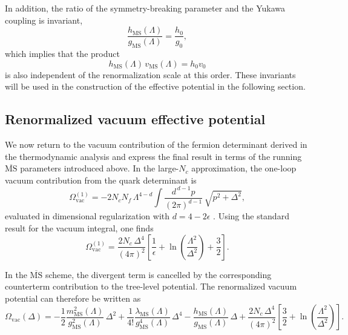 In addition, the ratio of the symmetry-breaking parameter and the
Yukawa coupling is invariant,
\begin{equation}
\frac{h_{\mathrm{MS}}(\Lambda)}{g_{\mathrm{MS}}(\Lambda)}
=
\frac{h_0}{g_0},
\end{equation}
which implies that the product
\begin{equation}
h_{\mathrm{MS}}(\Lambda)\,v_{\mathrm{MS}}(\Lambda)
=
h_0 v_0
\end{equation}
is also independent of the renormalization scale at this order.
These invariants will be used in the construction of the effective
potential in the following section.

\subsection*{Renormalized vacuum effective potential}

We now return to the vacuum contribution of the fermion determinant
derived in the thermodynamic analysis and express the final result in
terms of the running \(\overline{\mathrm{MS}}\) parameters introduced
above. In the large-\(N_c\) approximation, the one-loop vacuum
contribution from the quark determinant is
\begin{equation}
\Omega_{\mathrm{vac}}^{(1)}
=
-2N_cN_f\,\Lambda^{4-d}
\int \frac{d^{\,d-1}p}{(2\pi)^{d-1}}\,
\sqrt{p^2+\Delta^2},
\label{eq:qm_Omega_vac_start}
\end{equation}
evaluated in dimensional regularization with \(d=4-2\epsilon\)
\cite{Folkestad2018}. Using the standard result for the vacuum
integral, one finds
\begin{equation}
\Omega_{\mathrm{vac}}^{(1)}
=
\frac{2N_c\,\Delta^4}{(4\pi)^2}
\left[
\frac{1}{\epsilon}
+
\ln\!\left(\frac{\Lambda^2}{\Delta^2}\right)
+
\frac{3}{2}
\right].
\label{eq:qm_Omega_vac_div}
\end{equation}

In the \(\overline{\mathrm{MS}}\) scheme, the divergent term is
cancelled by the corresponding counterterm contribution to the
tree-level potential. The renormalized vacuum potential can therefore
be written as
\begin{equation}
\Omega_{\mathrm{vac}}(\Delta)
=
-\frac{1}{2}\frac{m_{\mathrm{MS}}^2(\Lambda)}
{g_{\mathrm{MS}}^2(\Lambda)}\,\Delta^2
+
\frac{1}{4!}\frac{\lambda_{\mathrm{MS}}(\Lambda)}
{g_{\mathrm{MS}}^4(\Lambda)}\,\Delta^4
-
\frac{h_{\mathrm{MS}}(\Lambda)}
{g_{\mathrm{MS}}(\Lambda)}\,\Delta
+
\frac{2N_c\,\Delta^4}{(4\pi)^2}
\left[
\frac{3}{2}
+
\ln\!\left(\frac{\Lambda^2}{\Delta^2}\right)
\right].
\label{eq:qm_Omega_vac_ren}
\end{equation}

